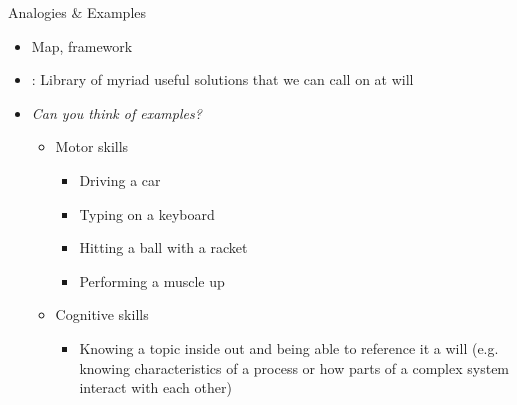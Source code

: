 \documentclass{ercisbeamer}
\begin{document}
\begin{frame}{Analogies \& Examples}
    \begin{tbox}
        \begin{itemize}
            \item Map, framework
            \item {}: Library of myriad useful solutions that we can call on at will
        \end{itemize}
    \end{tbox}

    \vspace{.5em}

    \begin{tbox}
        \begin{itemize}
            \item \emph{Can you think of examples?} \pause
            \begin{itemize}
                \item Motor skills
                \begin{itemize}
                    \item Driving a car
                    \item Typing on a keyboard
                    \item Hitting a ball with a racket
                    \item Performing a muscle up
                \end{itemize}
                \item Cognitive skills
                \begin{itemize}
                    \item Knowing a topic inside out and being able to reference it a will (e.g. knowing characteristics of a process or how parts of a complex system interact with each other)
                \end{itemize}
            \end{itemize}
        \end{itemize}    
    \end{tbox}
\end{frame}

\end{document}
